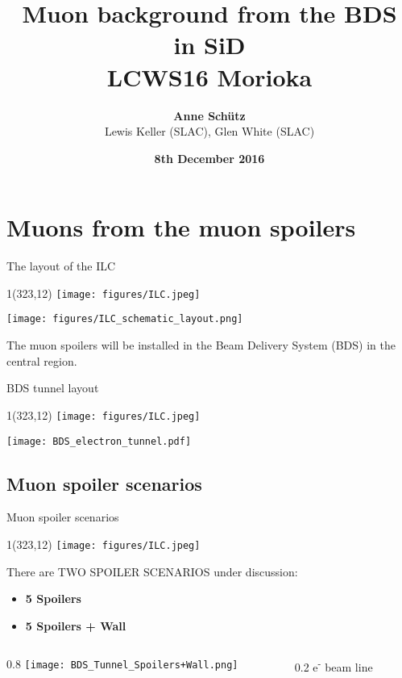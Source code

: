 \documentclass[xcolor={dvipsnames}]{beamer}
\title[ILC \& Muons from spoilers]{\textbf{\LARGE Muon background from the BDS\\in SiD} \\ \vspace*{0.3cm} \small LCWS16 Morioka}
\author[Anne Sch\"utz]{\textbf{Anne Sch\"utz}\\Lewis Keller (SLAC), Glen White (SLAC)}
\institute{\textbf{DESY}}
\date{\textbf{8th December 2016}}
\newcommand{\ilclogo}{
  \setlength{\TPHorizModule}{1pt}
  \setlength{\TPVertModule}{1pt}
  \begin{textblock}{1}(323,12)
   \texttt{[image: figures/ILC.jpeg]}
  \end{textblock}
}
\begin{document}
{
\begin{frame}
  \titlepage
\end{frame}
}
\begin{frame}
  \tableofcontents
\end{frame}

\section{Muons from the muon spoilers}
\begin{frame}{The layout of the ILC}
\ilclogo
\begin{center}
\texttt{[image: figures/ILC\_schematic\_layout.png]}
\end{center}
The muon spoilers will be installed in the Beam Delivery System (BDS) in the central region.
\end{frame}

\begin{frame}{BDS tunnel layout}
\ilclogo
\begin{center}
\texttt{[image: BDS\_electron\_tunnel.pdf]}
\end{center}
\end{frame}

\subsection{Muon spoiler scenarios}
\begin{frame}{Muon spoiler scenarios}
\ilclogo
There are TWO SPOILER SCENARIOS under discussion:
\begin{itemize}
 \item \textbf{5 Spoilers}
 \item \textbf{5 Spoilers + Wall}
\end{itemize}

\begin{columns}[b]
 \begin{column}{0.8\textwidth}
 \flushright
\texttt{[image: BDS\_Tunnel\_Spoilers+Wall.png]}
\end{column}
 \begin{column}{0.2\textwidth}
 \flushleft
e\textsuperscript{-} beam line
\vspace*{0.55cm}
\end{column}
\end{columns}
\end{frame}
\end{document}
